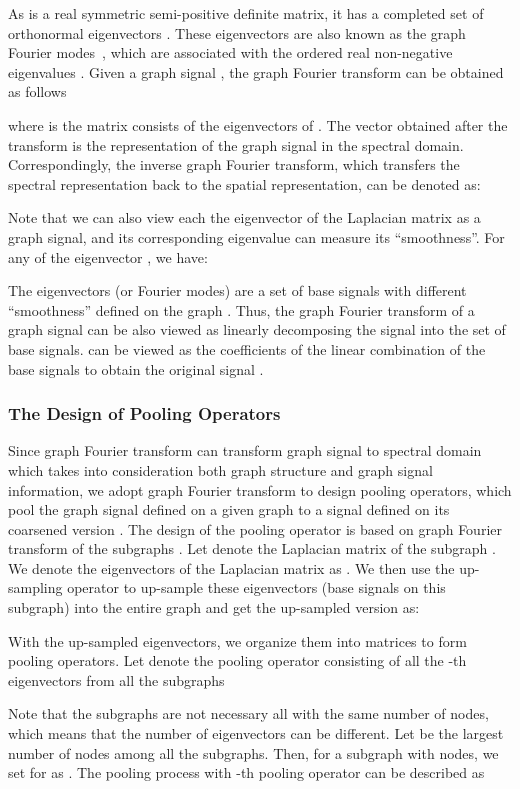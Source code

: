 \documentclass[sigconf]{acmart}
\begin{document}
As  is a real symmetric semi-positive definite matrix, it has a completed set of orthonormal eigenvectors . These eigenvectors are also known as the graph Fourier modes~\cite{shuman2013emerging}, which are associated with the ordered real non-negative eigenvalues . Given a graph signal , the graph Fourier transform can be obtained as follows

where  is the matrix consists of the eigenvectors of . The vector  obtained after the transform is the representation of the graph signal in the spectral domain. Correspondingly, the inverse graph Fourier transform, which transfers the spectral representation back to the spatial representation, can be denoted as: 


Note that we can also view each the eigenvector  of the Laplacian matrix  as a graph signal, and its corresponding eigenvalue  can measure its ``smoothness''. For any of the eigenvector , we have: 

The eigenvectors (or Fourier modes) are a set of base signals with different ``smoothness'' defined on the graph . Thus, the graph Fourier transform of a graph signal  can be also viewed as linearly decomposing the signal  into the set of base signals.  can be viewed as the coefficients of the linear combination of the base signals to obtain the original signal . 

\subsubsection{The Design of Pooling Operators}
Since graph Fourier transform can transform graph signal to spectral domain which takes into consideration both graph structure and graph signal information, we adopt graph Fourier transform to design pooling operators, which pool the graph signal defined on a given graph  to a signal defined on its coarsened version . The design of the pooling operator is based on graph Fourier transform of the subgraphs . Let  denote the Laplacian matrix of the subgraph . We denote the eigenvectors of the Laplacian matrix  as . We then use the up-sampling operator  to up-sample these eigenvectors (base signals on this subgraph) into the entire graph and get the up-sampled version as:

With the up-sampled eigenvectors, we organize them into matrices to form pooling operators. Let  denote the pooling operator consisting of all the -th eigenvectors from all the subgraphs


Note that the subgraphs are not necessary all with the same number of nodes, which means that the number of eigenvectors can be different. Let  be the largest number of nodes among all the subgraphs. Then, for a subgraph  with  nodes, we set  for  as . The pooling process with -th pooling operator  can be described as
\end{document}
